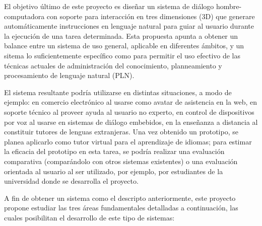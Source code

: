 
El objetivo \'ultimo de este proyecto es dise\~nar un sistema de di\'alogo hombre-computadora con soporte para interacci\'on en tres dimensiones (3D) que generare autom\'aticamente instrucciones en lenguaje natural para guiar  al usuario durante la ejecuci\'on de una tarea determinada. Esta propuesta apunta
a obtener un balance entre un sistema de uso general, aplicable en
diferentes \'ambitos, y un sitema lo suficientemente espec\'ifico
como para permitir el uso efectivo de las t\'ecnicas actuales de
administraci\'on del conocimiento, planneamiento y procesamiento de lenguaje natural (PLN).

El sistema resultante podr\'ia utilizarse en distintas situaciones, a modo de ejemplo:
en comercio electr\'onico  al usarse como avatar de asistencia en la web, en soporte t\'ecnico al proveer ayuda al usuario no experto, en
control de dispositivos por voz al usarse en sistemas de di\'alogo embebidos,
en la ense\~nanza a distancia al constituir tutores de lenguas extranjeras.  Una vez obtenido
un prototipo, se planea aplicarlo  como
tutor virtual para el aprendizaje de idiomas; para estimar la eficacia del prototipo  en esta tarea, se podr\'ia realizar una evaluaci\'on comparativa (compar\'andolo con otros sistemas existentes) o una evaluaci\'on orientada al usuario al ser utilizado, por ejemplo, por estudiantes de la universidad donde se desarrolla el proyecto.


A fin de obtener un sistema como el descripto anteriormente, este proyecto propone estudiar las tres \'areas fundamentales detalladas a continuaci\'on, las cuales posibilitan el desarrollo de este tipo de sistemas:



